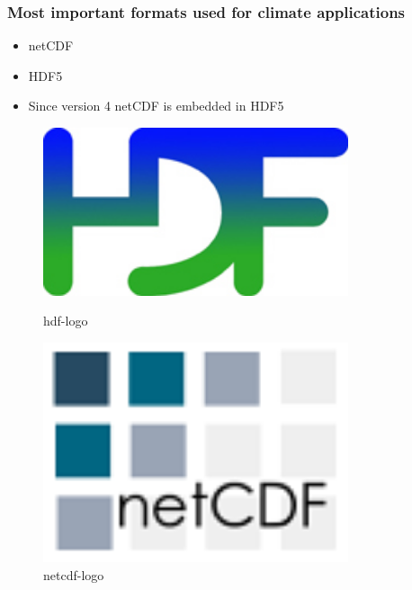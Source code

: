 \documentclass[compress]{beamer}
\begin{document}
\begin{frame}[fragile]
	\frametitle{Most important formats used for climate applications}

		\begin{itemize}
			\item netCDF
			\item HDF5
			\item Since version 4 netCDF is embedded in HDF5
		\end{itemize}

  \begin{figure}[htbp]
    \begin{minipage}{0.35\textwidth}
     \centering
      \includegraphics[width=0.8\textwidth]{gfx/hdf.jpg}
      \caption{hdf-logo \cite{hdf}}
    \end{minipage}\hfill
    \begin{minipage}{0.35\textwidth}
     \centering
      \includegraphics[width=0.8\textwidth]{gfx/netcdf.png}
      \caption{netcdf-logo \cite{netcdf}}
    \end{minipage}
  \end{figure}

\end{frame}
\end{document}
